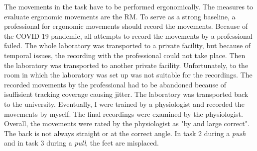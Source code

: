 The movements in the task have to be performed ergonomically. The measures to evaluate ergonomic movements are the RM. To serve as a strong baseline, a professional for ergonomic movements should record the movements. Because of the COVID-19 pandemic, all attempts to record the movements by a professional failed. The whole laboratory was transported to a private facility, but because of temporal issues, the recording with the professional could not take place. Then the laboratory was transported to another private facility. Unfortunately, to the room in which the laboratory was set up was not suitable for the recordings. The recorded movements by the professional had to be abandoned because of isuffisient tracking coverage causing jitter. The laboratory was transported back to the university. Eventually, I were trained by a physiologist and recorded the movements by myself. The final recordings were examined by the physiologist. Overall, the movements were rated by the physiologist as "by and large correct". The back is not always straight or at the correct angle. In task 2 during a \textit{push} and in task 3 during a \textit{pull}, the feet are misplaced.\\

